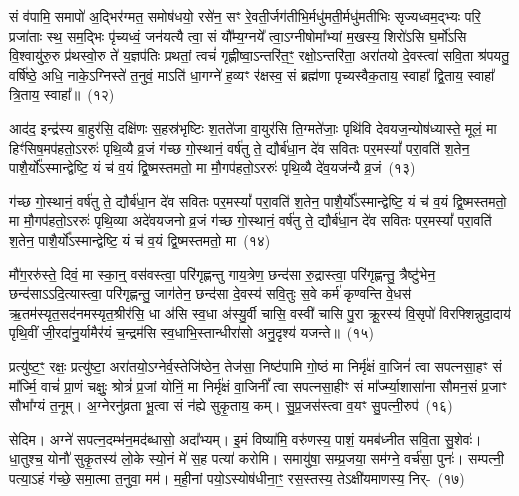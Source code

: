 सं व॑पामि॒ समापो॑ अ॒द्भिर॑ग्मत॒ समोष॑धयो॒ रसे॑न॒ सꣳ रे॒वती॒र्जग॑तीभि॒र्मधु॑मती॒र्मधु॑\-मतीभिः सृज्यध्वम॒द्भ्यः परि॒ प्रजा॑ताः स्थ॒ सम॒द्भिः पृ॑च्यध्वं॒ जन॑यत्यै त्वा॒ सं यौ᳚म्य॒ग्नये᳚ त्वा॒\-ऽग्नी\-षोमा᳚भ्यां म॒खस्य॒ शिरो॑\-ऽसि घ॒र्मो॑\-ऽसि वि॒श्वायु॑रु॒रु प्र॑थस्वो॒रु ते॑ य॒ज्ञप॑तिः प्रथतां॒ त्वचं॑ गृह्णीष्वा॒\-ऽन्तरि॑त॒ꣳ॒ रक्षो॒\-ऽन्तरि॑ता॒ अरा॑तयो दे॒वस्त्वा॑ सवि॒ता श्र॑पयतु॒ वर्\mbox{}षि॑ष्ठे॒ अधि॒ नाके॒\-ऽग्निस्ते॑ त॒नुवं॒ मा\-ऽति॑ धा॒गग्ने॑ ह॒व्यꣳ र॑क्षस्व॒ सं ब्रह्म॑णा पृच्यस्वैक॒ताय॒ स्वाहा᳚ द्वि॒ताय॒ स्वाहा᳚ त्रि॒ताय॒ स्वाहा᳚॥~(१२)\ip

{\anuvakamend[{स॒वि॒ता द्वाविꣳ॑शतिश्च}]}

आद॑द॒ इन्द्र॑स्य बा॒हुर॑सि॒ दक्षि॑णः स॒हस्र॑भृष्टिः श॒तते॑जा वा॒युर॑सि ति॒ग्मते॑जाः॒ पृथि॑वि देवयज॒न्योष॑ध्यास्ते॒ मूलं॒ मा हिꣳ॑सिष॒मप॑हतो॒\-ऽररुः॑ पृथि॒व्यै व्र॒जं ग॑च्छ गो॒स्थानं॒ वर्\mbox{}ष॑तु ते॒ द्यौर्ब॑धा॒न दे॑व सवितः पर॒मस्यां᳚ परा॒वति॑ श॒तेन॒ पाशै॒र्यो᳚\-ऽस्मान्द्वेष्टि॒ यं च॑ व॒यं द्वि॒ष्मस्तमतो॒ मा मौ॒गप॑हतो॒\-ऽररुः॑ पृथि॒व्यै दे॑व॒यज॑न्यै व्र॒जं~(१३)\ip

ग॑च्छ गो॒स्थानं॒ वर्\mbox{}ष॑तु ते॒ द्यौर्ब॑धा॒न दे॑व सवितः पर॒मस्यां᳚ परा॒वति॑ श॒तेन॒ पाशै॒र्यो᳚\-ऽस्मान्द्वेष्टि॒ यं च॑ व॒यं द्वि॒ष्मस्तमतो॒ मा मौ॒गप॑हतो॒\-ऽररुः॑ पृथि॒व्या अदे॑वयजनो व्र॒जं ग॑च्छ गो॒स्थानं॒ वर्\mbox{}ष॑तु ते॒ द्यौर्ब॑धा॒न दे॑व सवितः पर॒मस्यां᳚ परा॒वति॑ श॒तेन॒ पाशै॒र्यो᳚\-ऽस्मान्द्वेष्टि॒ यं च॑ व॒यं द्वि॒ष्मस्तमतो॒ मा~(१४)\ip

मौ॑ग॒ररु॑स्ते॒ दिवं॒ मा स्का॒न्॒ वस॑वस्त्वा॒ परि॑गृह्णन्तु गाय॒त्रेण॒ छन्द॑सा रु॒द्रास्त्वा॒ परि॑गृह्णन्तु॒ त्रैष्टु॑भेन॒ छन्द॑सा\-ऽऽ\-दि॒त्यास्त्वा॒ परि॑गृह्णन्तु॒ जाग॑तेन॒ छन्द॑सा दे॒वस्य॑ सवि॒तुः स॒वे कर्म॑ कृण्वन्ति वे॒धस॑ ऋ॒तम॑स्यृत॒सद॑नमस्यृत॒श्रीर॑सि॒ धा अ॑सि स्व॒धा अ॑स्यु॒र्वी चासि॒ वस्वी॑ चासि पु॒रा क्रू॒रस्य॑ वि॒सृपो॑ विरफ्शिन्नुदा॒दाय॑ पृथि॒वीं जी॒रदा॑नु॒र्यामैर॑यं च॒न्द्रम॑सि स्व॒धाभि॒स्तान्धीरा॑सो अनु॒दृश्य॑ यजन्ते॥~(१५)\ip

{\anuvakamend[{दे॒व॒यज॑न्यै व्र॒जन्तमतो॒ मा वि॑रफ्शि॒न्नेका॑\-दश च}]}

प्रत्यु॑ष्ट॒ꣳ॒ रक्षः॒ प्रत्यु॑ष्टा॒ अरा॑तयो॒\-ऽग्नेर्व॒स्तेजि॑ष्ठेन॒ तेज॑सा॒ निष्ट॑पामि गो॒ष्ठं मा निर्मृ॑क्षं वा॒जिनं॑ त्वा सपत्नसा॒हꣳ सं मा᳚र्ज्मि॒ वाचं॑ प्रा॒णं चक्षुः॒ श्रोत्रं॑ प्र॒जां योनिं॒ मा निर्मृ॑क्षं वा॒जिनीं᳚ त्वा सपत्नसा॒हीꣳ सं मा᳚र्ज्म्या॒शासा॑ना सौमन॒सं प्र॒जाꣳ सौभा᳚ग्यं त॒नूम्। अ॒ग्नेरनु॑व्रता भू॒त्वा सं न॑ह्ये सुकृ॒ताय॒ कम्। सु॒प्र॒जस॑स्त्वा व॒यꣳ सु॒पत्नी॒रुप॑~(१६)\ip

सेदिम। अग्ने॑ सपत्न॒दम्भ॑न॒मद॑ब्धासो॒ अदा᳚भ्यम्। इ॒मं विष्या॑मि॒ वरु॑णस्य॒ पाशं॒ यमब॑ध्नीत सवि॒ता सु॒शेवः॑। धा॒तुश्च॒ योनौ॑ सुकृ॒तस्य॑ लो॒के स्यो॒नं मे॑ स॒ह पत्या॑ करोमि। समायु॑षा॒ सम्प्र॒जया॒ सम॑ग्ने॒ वर्च॑सा॒ पुनः॑। सम्पत्नी॒ पत्या॒\-ऽहं ग॑च्छे॒ समा॒त्मा त॒नुवा॒ मम॑। म॒ही॒नां पयो॒\-ऽस्योष॑धीना॒ꣳ॒ रस॒स्तस्य॒ ते\-ऽक्षी॑यमाणस्य॒ निर्-~(१७)\ip

